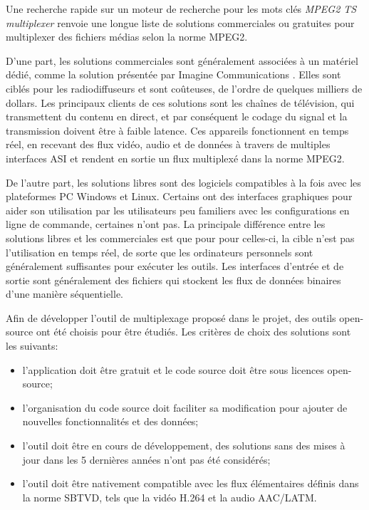 \documentclass[12pt,a4paper]{article}
\begin{document}
Une recherche rapide sur un moteur de recherche pour les mots clés \textit{MPEG2 TS multiplexer} renvoie une longue liste de solutions commerciales ou gratuites pour multiplexer des fichiers médias selon la norme MPEG2.

D'une part, les solutions commerciales sont généralement associées à un matériel dédié, comme la solution présentée par Imagine Communications \cite{harris}. Elles sont ciblés pour les radiodiffuseurs et sont coûteuses, de l'ordre de quelques milliers de dollars. Les principaux clients de ces solutions sont les chaînes de télévision, qui transmettent du contenu en direct, et par conséquent le codage du signal et la transmission doivent être à faible latence. Ces appareils fonctionnent en temps réel, en recevant des flux vidéo, audio et de données à travers de multiples interfaces ASI et rendent en sortie un flux multiplexé dans la norme MPEG2.

De l'autre part, les solutions libres sont des logiciels compatibles à la fois avec les plateformes PC Windows et Linux. Certains ont des interfaces graphiques pour aider son utilisation par les utilisateurs peu familiers avec les configurations en ligne de commande, certaines n'ont pas. La principale différence entre les solutions libres et les commerciales est que pour pour celles-ci, la cible n'est pas l'utilisation en temps réel, de sorte que les ordinateurs personnels sont généralement suffisantes pour exécuter les outils. Les interfaces d'entrée et de sortie sont généralement des fichiers qui stockent les flux de données binaires d'une manière séquentielle.

Afin de développer l'outil de multiplexage proposé dans le projet, des outils open-source ont été choisis pour être étudiés. Les critères de choix des solutions sont les suivants:
\begin{itemize}
\item{l'application doit être gratuit et le code source doit être sous licences open-source;}
\item{l'organisation du code source doit faciliter sa modification pour ajouter de nouvelles fonctionnalités et des données;}
\item{l'outil doit être en cours de développement, des solutions sans des mises à jour dans les 5 dernières années n'ont pas été considérés;}
\item{l'outil doit être nativement compatible avec les flux élémentaires définis dans la norme SBTVD, tels que la vidéo H.264 et la audio AAC/LATM.}
\end{itemize}
\end{document}
